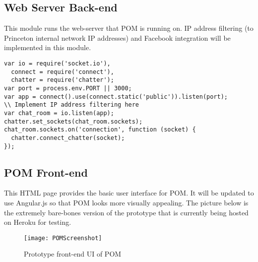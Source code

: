 \documentclass{article}
\begin{document}
\subsection{Web Server Back-end}

This module runs the web-server that POM is running on. IP address filtering (to Princeton internal network IP addresses) and Facebook integration will be implemented in this module.

\begin{lstlisting}
var io = require('socket.io'),
  connect = require('connect'),
  chatter = require('chatter');
var port = process.env.PORT || 3000;
var app = connect().use(connect.static('public')).listen(port);
\\ Implement IP address filtering here
var chat_room = io.listen(app);
chatter.set_sockets(chat_room.sockets);
chat_room.sockets.on('connection', function (socket) {
  chatter.connect_chatter(socket);
});
\end{lstlisting}

\subsection{POM Front-end}

This HTML page provides the basic user interface for POM. It will be updated to use Angular.js so that POM looks more visually appealing. The picture below is the extremely bare-bones version of the prototype that is currently being hosted on Heroku for testing. 

\begin{figure}
\centering
\texttt{[image: POMScreenshot]}
\caption{Prototype front-end UI of POM}
\end{figure}
\end{document}
